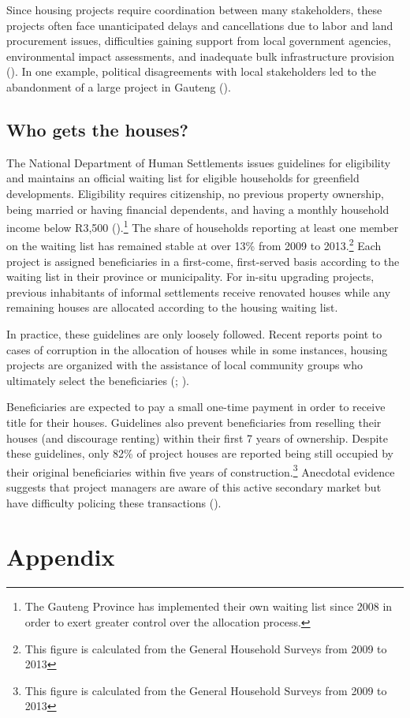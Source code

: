 \documentclass[12pt]{article}
\begin{document}
Since housing projects require coordination between many stakeholders, these projects often face unanticipated delays and cancellations due to labor and land procurement issues, difficulties gaining support from local government agencies, environmental impact assessments, and inadequate bulk infrastructure provision (\cite{dhsreports}).  In one example, political disagreements with local stakeholders led to the abandonment of a large project in Gauteng (\cite{protest}).

\subsection{Who gets the houses?}

The National Department of Human Settlements issues guidelines for eligibility and maintains an official waiting list for eligible households for greenfield developments.  Eligibility requires citizenship, no previous property ownership, being married or having financial dependents, and having a monthly household income below R3,500 (\cite{seriq}).\footnote{The Gauteng Province has implemented their own waiting list since 2008 in order to exert greater control over the allocation process.}  The share of households reporting at least one member on the waiting list has remained stable at over 13\% from 2009 to 2013.\footnote{This figure is calculated from the General Household Surveys from 2009 to 2013}  Each project is assigned beneficiaries in a first-come, first-served basis according to the waiting list in their province or municipality.  For in-situ upgrading projects, previous inhabitants of informal settlements receive renovated houses while any remaining houses are allocated according to the housing waiting list.

In practice, these guidelines are only loosely followed.  Recent reports point to cases of corruption in the allocation of houses while in some instances, housing projects are organized with the assistance of local community groups who ultimately select the beneficiaries (\cite{seriq}; \cite{casestudytinazonke}). 

Beneficiaries are expected to pay a small one-time payment in order to receive title for their houses.  Guidelines also prevent beneficiaries from reselling their houses (and discourage renting) within their first 7 years of ownership.  Despite these guidelines, only 82\% of project houses are reported being still occupied by their original beneficiaries within five years of construction.\footnote{This figure is calculated from the General Household Surveys from 2009 to 2013}  Anecdotal evidence suggests that project managers are aware of this active secondary market but have difficulty policing these transactions (\cite{resale}).





{}
\nocite{*}
\singlespacing
\setlength\bibsep{0pt}








\appendix
\doublespacing

\section*{Appendix}
\end{document}
